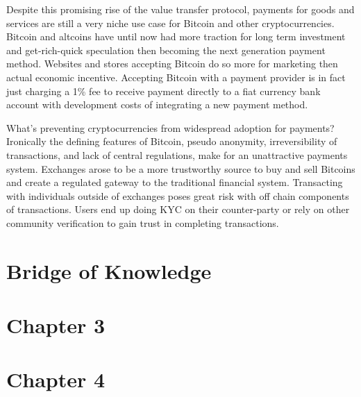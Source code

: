 \documentclass[12pt]{article} %
\begin{document}
Despite this promising rise of the value transfer protocol, payments for goods and services are still a very niche use case for Bitcoin and other cryptocurrencies.  Bitcoin and altcoins have until now had more traction for long term investment and get-rich-quick speculation then becoming the next generation payment method. Websites and stores accepting Bitcoin do so more for marketing then actual economic incentive.  Accepting Bitcoin with a payment provider is in fact just charging a 1\% fee to receive payment directly to a fiat currency bank account with development costs of integrating a new payment method. 

What's preventing cryptocurrencies from widespread adoption for payments? Ironically the defining features of Bitcoin, pseudo anonymity, irreversibility of transactions, and lack of central regulations, make for an unattractive payments system.  Exchanges arose to be a more trustworthy source to buy and sell Bitcoins and create a regulated gateway to the traditional financial system. Transacting with individuals outside of exchanges poses great risk with off chain components of transactions. Users end up doing KYC on their counter-party or rely on other community verification to gain trust in completing transactions.


\pagebreak

\section{Bridge of Knowledge}
\label{Bridge of Knowledge}


\pagebreak

\section{Chapter 3}
\label{Chapter 3}


\pagebreak

\section{Chapter 4}
\label{Chapter 4}
\end{document}
